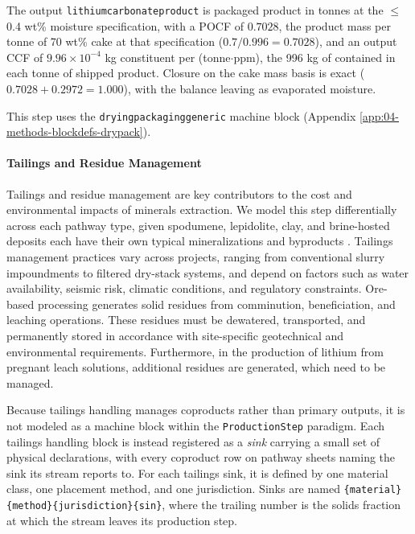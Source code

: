 \documentclass{article}
\renewcommand\_{\textunderscore\allowbreak}
\begin{document}
The output \texttt{lithium\_carbonate\_product} is packaged product in tonnes at the $\leq$0.4 wt\% moisture specification, with a POCF of $0.7028$, the product mass per tonne of 70 wt\% cake at that specification ($0.7/0.996 = 0.7028$), and an output CCF of $9.96 \times 10^{-4}$ kg constituent per (tonne$\cdot$ppm), the 996 kg of  contained in each tonne of shipped product. Closure on the cake mass basis is exact ($0.7028 + 0.2972 = 1.000$), with the balance leaving as evaporated moisture.

This step uses the \texttt{drying\_packaging\_generic} machine block (Appendix \ref{app:04-methods-blockdefs-drypack}).

\paragraph{Tailings and Residue Management}\label{app:04-methods-facilitychoices-tailings}\leavevmode\par

Tailings and residue management are key contributors to the cost and environmental impacts of minerals extraction. We model this step differentially across each pathway type, given spodumene, lepidolite, clay, and brine-hosted deposits each have their own typical mineralizations and byproducts \citep{khakmardanComparativeLifeCycle2023, chordiaLifeCycleEnvironmental2022, setuEnvironmentalImpactAssessment2026, royLithiumClayAssessing2024}. Tailings management practices vary across projects, ranging from conventional slurry impoundments to filtered dry-stack systems, and depend on factors such as water availability, seismic risk, climatic conditions, and regulatory constraints. Ore-based processing generates solid residues from comminution, beneficiation, and leaching operations. These residues must be dewatered, transported, and permanently stored in accordance with site-specific geotechnical and environmental requirements. Furthermore, in the production of lithium from pregnant leach solutions, additional residues are generated, which need to be managed. 

Because tailings handling manages coproducts rather than primary outputs, it is not modeled as a machine block within the \texttt{ProductionStep} paradigm. Each tailings handling block is instead registered as a \textit{sink} carrying a small set of physical declarations, with every coproduct row on pathway sheets naming the sink its stream reports to. For each tailings sink, it is defined by one material class, one placement method, and one jurisdiction. Sinks are named \texttt{\{material\}\_\{method\}\_\{jurisdiction\}\_\{s\_in\}}, where the trailing number is the solids fraction at which the stream leaves its production step.
\end{document}
